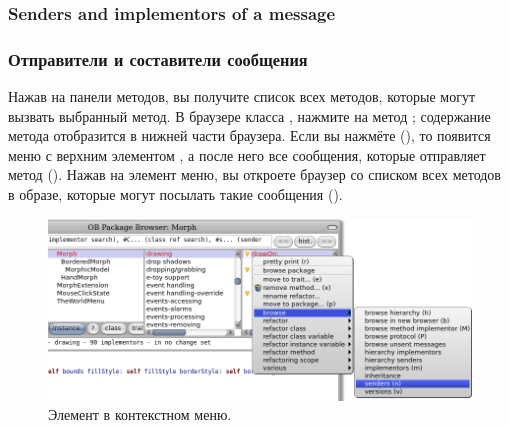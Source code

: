 \documentclass[a4paper,10pt,twoside]{book}
\begin{document}
\subsubsection{Senders and implementors of a message}
\subsubsection{Отправители и составители сообщения}


Нажав  на панели методов, вы получите список всех методов, которые могут вызвать выбранный метод. В браузере класса , нажмите на метод ; содержание метода отобразится в нижней части браузера. Если вы нажмёте  (), то появится меню с верхним элементом , а после него все сообщения, которые отправляет метод  (). Нажав на элемент меню, вы откроете браузер со списком всех методов в образе, которые могут посылать такие сообщения ().

\begin{figure}[htb]
\centerline {\includegraphics[width=\textwidth]{SendersOfDrawOn}}
\caption{Элемент  в контекстном меню.}
\end{figure}
\end{document}
